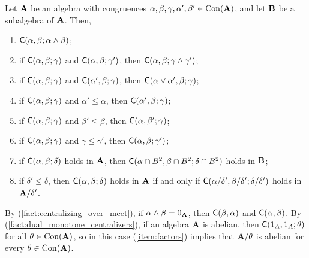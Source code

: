 \begin{lem}
\label{lem:centralizers}
Let $\mathbf{A}$ be an algebra with congruences 
$\alpha, \beta, \gamma, \alpha', \beta' \in \operatorname{Con}(\mathbf{A})$, and let 
$\mathbf{B}$ be a subalgebra of $\mathbf{A}$. Then,
\begin{enumerate}
\item \label{fact:centralizing_over_meet}
  $\mathsf{C}(\alpha, \beta; \alpha \wedge \beta)$;
\item \label{fact:centralizing_over_meet2}
  if $\mathsf{C}(\alpha, \beta; \gamma)$ and $\mathsf{C}(\alpha, \beta; \gamma')$, then
  $\mathsf{C}(\alpha, \beta; \gamma \wedge \gamma')$;
\item \label{fact:centralizing_over_join1}
  if $\mathsf{C}(\alpha, \beta; \gamma)$ and $\mathsf{C}(\alpha', \beta; \gamma)$, then
  $\mathsf{C}(\alpha \vee \alpha', \beta; \gamma)$;
\item \label{fact:monotone_centralizers1}
  if $\mathsf{C}(\alpha, \beta; \gamma)$ and $\alpha' \leq \alpha$, then 
  $\mathsf{C}(\alpha', \beta; \gamma)$;
\item \label{fact:monotone_centralizers2}
  if $\mathsf{C}(\alpha, \beta; \gamma)$ and $\beta' \leq \beta$, then
  $\mathsf{C}(\alpha, \beta'; \gamma)$;
\item \label{fact:dual_monotone_centralizers}
  if $\mathsf{C}(\alpha, \beta; \gamma)$ and $\gamma \leq \gamma'$, then
  $\mathsf{C}(\alpha, \beta; \gamma')$;
\item \label{item:subalg}
  if $\mathsf{C}(\alpha, \beta; \delta)$ holds in $\mathbf{A}$, 
  then $\mathsf{C}(\alpha\cap B^2, \beta\cap B^2;\delta\cap B^2)$ holds in $\mathbf{B}$;
\item \label{item:factors}
  if $\delta' \leq \delta$, then $\mathsf{C}(\alpha, \beta; \delta)$ holds 
  in $\mathbf{A}$ if and only if $\mathsf{C}(\alpha/\delta', \beta/\delta'; \delta/\delta')$
  holds in $\mathbf{A}/\delta'$.
\end{enumerate}
\end{lem}


\begin{rem}
By (\ref{fact:centralizing_over_meet}), 
if $\alpha \wedge \beta = 0_{\mathbf{A}}$,  
then $\mathsf{C}(\beta, \alpha)$ and $\mathsf{C}(\alpha, \beta)$.
By (\ref{fact:dual_monotone_centralizers}),
if an algebra $\mathbf{A}$ is abelian, 
then $\mathsf{C}(1_A, 1_A; \theta)$ for all $\theta \in \operatorname{Con}(\mathbf{A})$, so
in this case (\ref{item:factors}) implies that %
$\mathbf{A}/\theta$ is abelian for every $\theta \in \operatorname{Con}(\mathbf{A})$.
\end{rem}

